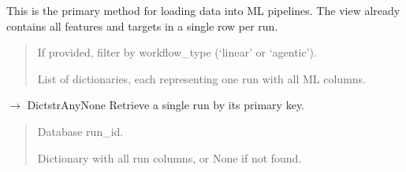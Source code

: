 \documentclass[letterpaper,10pt,english]{sphinxmanual}
\begin{document}
\begin{fulllineitems}
\begin{fulllineitems}
\sphinxAtStartPar
This is the primary method for loading data into ML pipelines.
The view already contains all features and targets in a single row per run.
\begin{quote}\begin{description}
\sphinxAtStartPar
{} \textendash{} If provided, filter by workflow\_type (‘linear’ or ‘agentic’).

\sphinxAtStartPar
List of dictionaries, each representing one run with all ML columns.

\end{description}\end{quote}

\end{fulllineitems}


\begin{fulllineitems}
\label{\detokenize{core.database.manager_oldversion:core.database.manager_oldversion.DatabaseManager.get_run}}
\pysigstartsignatures
\pysiglinewithargsret
{}
{}
{{ $\rightarrow$ Dict\DUrole{p}{{[}}strAny\DUrole{p}{{]}}None}}
\pysigstopsignatures
\sphinxAtStartPar
Retrieve a single run by its primary key.
\begin{quote}\begin{description}
\sphinxAtStartPar
{} \textendash{} Database run\_id.

\sphinxAtStartPar
Dictionary with all run columns, or None if not found.

\end{description}\end{quote}

\end{fulllineitems}



\end{fulllineitems}
\end{document}
